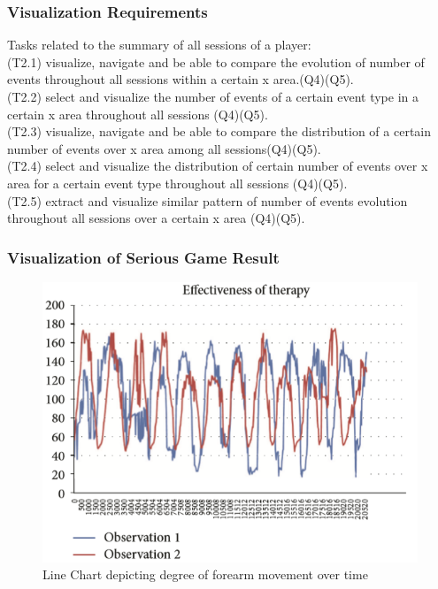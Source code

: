 \documentclass{beamer}
\begin{document}
\begin{frame}
\frametitle{Visualization Requirements}
Tasks related to the summary of all sessions of a player:\\
(T2.1) visualize, navigate and be able to compare the evolution of number of events throughout all sessions within a certain x area.(Q4)(Q5). \\
(T2.2) select and visualize the number of events of a certain event type in a certain x area throughout all sessions (Q4)(Q5).\\ 
(T2.3) visualize, navigate and be able to compare the distribution of a certain number of events over x area among all sessions(Q4)(Q5). \\
(T2.4) select and visualize the distribution of certain number of events over x area for a certain event type throughout all sessions (Q4)(Q5). \\
(T2.5) extract and visualize similar pattern of number of events evolution throughout all sessions over a certain x area (Q4)(Q5).
\end{frame}

\begin{frame}
\frametitle{Visualization of Serious Game Result}
\begin{figure}
\includegraphics[scale=0.5]{images/rahman_viz.png}
\caption{Line Chart depicting degree of forearm movement over time}
\end{figure}
\end{frame}
\end{document}
